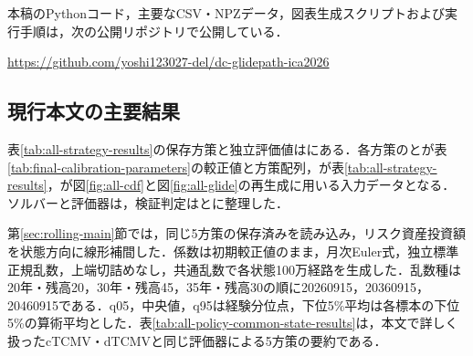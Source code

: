 \documentclass[10pt,a4paper]{article}
\theoremstyle{plain}
\theoremstyle{definition}
\begin{document}
本稿のPythonコード，主要なCSV・NPZデータ，図表生成スクリプトおよび実行手順は，次の公開リポジトリで公開している．
\begin{center}
\url{https://github.com/yoshi123027-del/dc-glidepath-ica2026}
\end{center}

\subsection{現行本文の主要結果}
表\ref{tab:all-strategy-results}の保存方策と独立評価値はにある．各方策のとが表\ref{tab:final-calibration-parameters}の較正値と方策配列，が表\ref{tab:all-strategy-results}，が図\ref{fig:all-cdf}と図\ref{fig:all-glide}の再生成に用いる入力データとなる．ソルバーと評価器は，検証判定はとに整理した．

第\ref{sec:rolling-main}節では，同じ5方策の保存済みを読み込み，リスク資産投資額を状態方向に線形補間した．係数は初期較正値のまま，月次Euler式，独立標準正規乱数，上端切詰めなし，共通乱数で各状態100万経路を生成した．乱数種は20年・残高20，30年・残高45，35年・残高30の順に20260915，20360915，20460915である．q05，中央値，q95は経験分位点，下位5\%平均は各標本の下位5\%の算術平均とした．表\ref{tab:all-policy-common-state-results}は，本文で詳しく扱ったcTCMV・dTCMVと同じ評価器による5方策の要約である．
\end{document}
